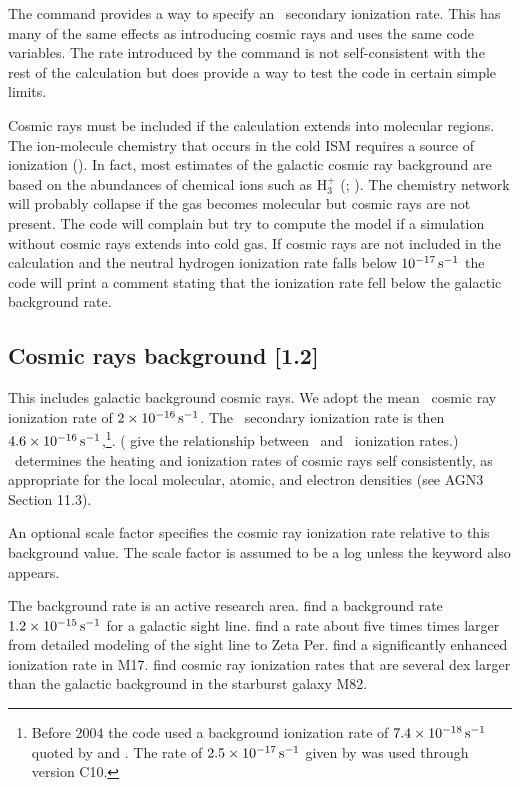 The  command provides a way to
specify an \hO\ secondary ionization rate.
This has many of the same effects
as introducing cosmic rays and uses the same code variables.
The rate
introduced by the  command is not
self-consistent with the rest of the calculation but does
provide a way to test the code in certain simple limits.

Cosmic rays must be included if the calculation extends into molecular
regions.
The ion-molecule chemistry that occurs in the cold ISM requires
a source of ionization (\citealp{Dyson1997}).
In fact, most estimates
of the galactic cosmic ray background are based
on the abundances of chemical
ions such as H$_{3}^{+}$ (\citealp{McCall2003}; \citealp{Shaw2008}).
The chemistry
network will probably collapse if the gas becomes molecular
but cosmic rays
are not present.
The code will complain but try to compute the model if
a simulation without cosmic rays extends into cold gas.
If cosmic rays
are not included in the calculation and the neutral hydrogen ionization
rate falls below $10^{-17} {\rm\thinspace s^{-1}}$
the code will print a comment stating that the
ionization rate fell below the galactic background rate.

\subsection{Cosmic rays background [1.2]}

This includes galactic background cosmic rays.
We adopt the \citet{Indriolo2007} mean \hO\ cosmic ray ionization rate 
of $2\times 10^{-16} {\rm\thinspace s^{-1}}$.
The \htwo\ secondary ionization
rate is then $4.6\times 10^{-16} {\rm\thinspace s^{-1}}$,\footnote{Before 2004 the code used a
background ionization rate of $7.4\times 10^{-18} {\rm\thinspace s^{-1}}$
quoted by \citet[Table 10]{Tielens1985a}
and \citet{McKee1999}.
The rate of $2.5\times 10^{-17} {\rm\thinspace s^{-1}}$ given by \citet{Williams1998} was used through
version C10.}.
(\citet{Glassgold.A74Model-calculations-for-diffuse-molecular} give the
relationship between \hO\ and \htwo\ ionization rates.)
\Cloudy\ determines the heating and
ionization rates of cosmic rays self consistently,
as appropriate for the
local molecular, atomic, and electron densities
(see AGN3 Section 11.3).

An optional scale factor specifies the cosmic ray ionization rate
relative to this background value.
The scale factor is assumed to be a
log unless the keyword  also appears.

The background rate is an active research area.
\citet{McCall2003} find a background rate
$1.2 \times 10^{-15} {\rm\thinspace s^{-1}}$ for a galactic
sight line.
\citet{Shaw2008} find a rate about five times times larger from detailed
modeling of the sight line to Zeta Per.
\citet{Pellegrini2007} find a significantly enhanced ionization rate in M17.
\citet{Suchkov1993} find cosmic ray ionization rates that are
several dex larger than the galactic background in the starburst galaxy M82. 

